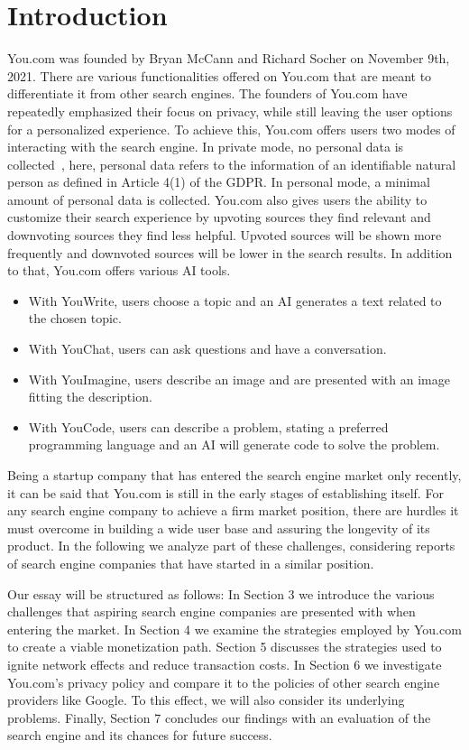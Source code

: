 \documentclass[5p,twocolumn,final]{elsarticle}
\begin{document}
\section{Introduction}
 You.com was founded by Bryan McCann and Richard Socher on November 9th, 2021. There are various functionalities offered on You.com that are meant to differentiate it from other search engines. The founders of You.com have repeatedly emphasized their focus on privacy, while still leaving the user options for a personalized experience. To achieve this, You.com offers users two modes of interacting with the search engine.  In private mode, no personal data is collected~\cite{youcom}, here, personal data refers to the information of an identifiable natural person as defined in Article 4(1) of the GDPR. In personal mode, a minimal amount of personal data is collected. You.com also gives users the ability to customize their search experience by upvoting sources they find relevant and downvoting sources they find less helpful. Upvoted sources will be shown more frequently and downvoted sources will be lower in the search results. In addition to that, You.com offers various AI tools.
\begin{itemize}
    \item With YouWrite, users choose a topic and an AI generates a text related to the chosen topic.
    \item With YouChat, users can ask questions and have a conversation.
    \item With YouImagine, users describe an image and are presented with an image fitting the description.
    \item With YouCode, users can describe a problem, stating a preferred programming language and an AI will generate code to solve the problem.
\end{itemize}
Being a startup company that has entered the search engine market only recently, it can be said that You.com is still in the early stages of establishing itself.
For any search engine company to achieve a firm market position, there are hurdles it must overcome in building a wide user base and assuring the longevity of its product. In the following we analyze part of these challenges, considering reports of search engine companies that have started in a similar position. \par
Our essay will be structured as follows: In Section 3 we introduce the various challenges that aspiring search engine companies are presented with when entering the market. In Section 4 we examine the strategies employed by You.com to create a viable monetization path. Section 5 discusses the strategies used to ignite network effects and reduce transaction costs. In Section 6 we investigate You.com's privacy policy and compare it to the policies of other search engine providers like Google. To this effect, we will also consider its underlying problems. Finally, Section 7 concludes our findings with an evaluation of the search engine and its chances for future success.
%
\end{document}
